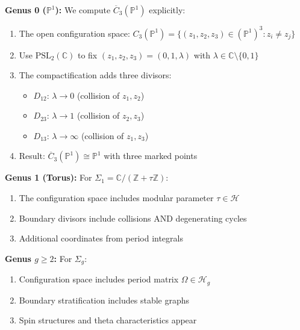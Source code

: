  
\begin{example}\label{ex:config-genera}
\textbf{Genus 0 ($\mathbb{P}^1$):} We compute $\overline{C}_3(\mathbb{P}^1)$ explicitly:
\begin{enumerate}
\item The open configuration space: $C_3(\mathbb{P}^1) = \{(z_1, z_2, z_3) \in (\mathbb{P}^1)^3 : z_i \neq z_j\}$

\item Use $\text{PSL}_2(\mathbb{C})$ to fix $(z_1, z_2, z_3) = (0, 1, \lambda)$ with $\lambda \in \mathbb{C} \setminus \{0,1\}$

\item The compactification adds three divisors:
   \begin{itemize}
   \item $D_{12}$: $\lambda \to 0$ (collision of $z_1, z_2$)  
   \item $D_{23}$: $\lambda \to 1$ (collision of $z_2, z_3$)
   \item $D_{13}$: $\lambda \to \infty$ (collision of $z_1, z_3$)
   \end{itemize}

\item Result: $\overline{C}_3(\mathbb{P}^1) \cong \mathbb{P}^1$ with three marked points
\end{enumerate}

\textbf{Genus 1 (Torus):} For $\Sigma_1 = \mathbb{C}/(\mathbb{Z} + \tau\mathbb{Z})$:
\begin{enumerate}
\item The configuration space includes modular parameter $\tau \in \mathcal{H}$
\item Boundary divisors include collisions AND degenerating cycles
\item Additional coordinates from period integrals
\end{enumerate}

\textbf{Genus $g \geq 2$:} For $\Sigma_g$:
\begin{enumerate}
\item Configuration space includes period matrix $\Omega \in \mathcal{H}_g$
\item Boundary stratification includes stable graphs
\item Spin structures and theta characteristics appear
\end{enumerate}


\end{example}
